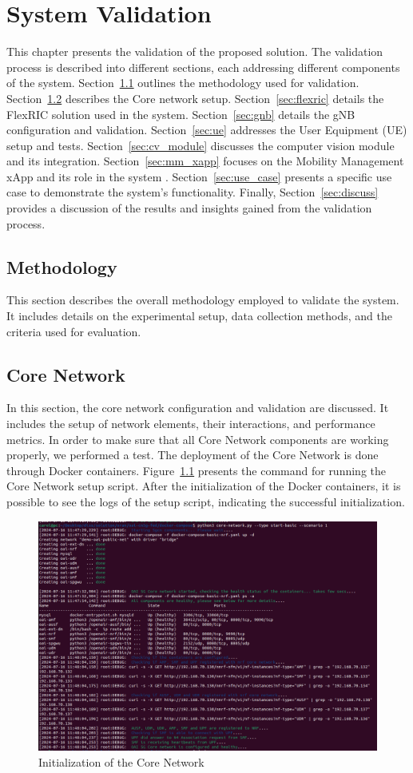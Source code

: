 \chapter{System Validation}\label{ch:validation}

This chapter presents the validation of the proposed solution.
The validation process is described into different sections, each addressing different components of the system.
Section~\ref{sec:meth} outlines the methodology used for validation.
Section~\ref{sec:core_network} describes the Core network setup.
Section~\ref{sec:flexric} details the FlexRIC solution used in the system.
Section~\ref{sec:gnb} details the gNB configuration and validation.
Section~\ref{sec:ue} addresses the User Equipment (UE) setup and tests.
Section~\ref{sec:cv_module} discusses the computer vision module and its integration.
Section~\ref{sec:mm_xapp} focuses on the Mobility Management xApp and its role in the system .
Section~\ref{sec:use_case} presents a specific use case to demonstrate the system's functionality.
Finally, Section~\ref{sec:discuss} provides a discussion of the results and insights gained from the validation process.

\section{Methodology}\label{sec:meth}
This section describes the overall methodology employed to validate the system.
It includes details on the experimental setup, data collection methods, and the criteria used for evaluation.

\section{Core Network}\label{sec:core_network}
In this section, the core network configuration and validation are discussed.
It includes the setup of network elements, their interactions, and performance metrics.
In order to make sure that all Core Network components are working properly, we performed a test.
The deployment of the Core Network is done through Docker containers.
Figure~\ref{fig:core_init} presents the command for running the Core Network setup script.
After the initialization of the Docker containers, it is possible to see the logs of the setup script, indicating the successful initialization.

\begin{figure}[H]
    \centering
    \includegraphics[width=0.5\linewidth]{figures/core_init}
    \caption[Initialization of the Core Network]{Initialization of the Core Network}
    \label{fig:core_init}
\end{figure}

